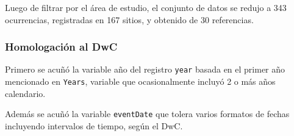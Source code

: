 \documentclass[sn-apa,pdflatex]{sn-jnl}
\newenvironment{Shaded}{\begin{snugshade}}{\end{snugshade}}
\newcommand{\CommentTok}[1]{\textcolor[rgb]{0.56,0.35,0.01}{\textit{#1}}}
\newcommand{\DecValTok}[1]{\textcolor[rgb]{0.00,0.00,0.81}{#1}}
\newcommand{\FunctionTok}[1]{\textcolor[rgb]{0.13,0.29,0.53}{\textbf{#1}}}
\newcommand{\NormalTok}[1]{#1}
\newcommand{\OtherTok}[1]{\textcolor[rgb]{0.56,0.35,0.01}{#1}}
\newcommand{\SpecialCharTok}[1]{\textcolor[rgb]{0.81,0.36,0.00}{\textbf{#1}}}
\newcommand{\StringTok}[1]{\textcolor[rgb]{0.31,0.60,0.02}{#1}}
\begin{document}
Luego de filtrar por el área de estudio, el conjunto de datos se redujo
a 343 ocurrencias, registradas en 167 sitios, y obtenido de 30
referencias.

\subsubsection{Homologación al DwC}\label{homologaciuxf3n-al-dwc}

Primero se acuñó la variable año del registro \texttt{year} basada en el
primer año mencionado en \texttt{Years}, variable que ocasionalmente
incluyó 2 o más años calendario.

\begin{Shaded}
\end{Shaded}

Además se acuñó la variable \texttt{eventDate} que tolera varios
formatos de fechas incluyendo intervalos de tiempo, según el DwC.
\end{document}
